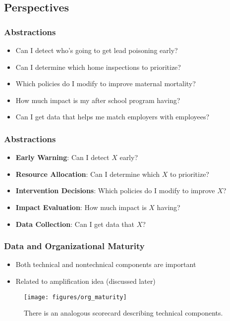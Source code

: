 \documentclass[10pt,mathserif]{beamer}
\begin{document}
\subsection{Perspectives}

\begin{frame}
  \frametitle{Abstractions}
  \begin{itemize}
  \item Can I detect who's going to get lead poisoning early?
  \item Can I determine which home inspections to prioritize?
  \item Which policies do I modify to improve maternal mortality?
  \item How much impact is my after school program having?
  \item Can I get data that helps me match employers with employees?
  \end{itemize}
\end{frame}

\begin{frame}
  \frametitle{Abstractions}
  \begin{itemize}
  \item \textbf{Early Warning}: Can I detect $X$ early?
  \item \textbf{Resource Allocation}: Can I determine which $X$ to prioritize?
  \item \textbf{Intervention Decisions}: Which policies do I modify to improve $X$?
  \item \textbf{Impact Evaluation}: How much impact is $X$ having?
  \item \textbf{Data Collection}: Can I get data that $X$?
  \end{itemize}
\end{frame}

\begin{frame}
  \frametitle{Data and Organizational Maturity}
  \begin{itemize}
  \item Both technical and nontechnical components are important
  \item Related to amplification idea (discussed later)
  \end{itemize}
  \begin{figure}[ht]
    \centering
    \texttt{[image: figures/org\_maturity]}
    \caption{There is an analogous scorecard describing technical components.}
  \end{figure}
\end{frame}
\end{document}
